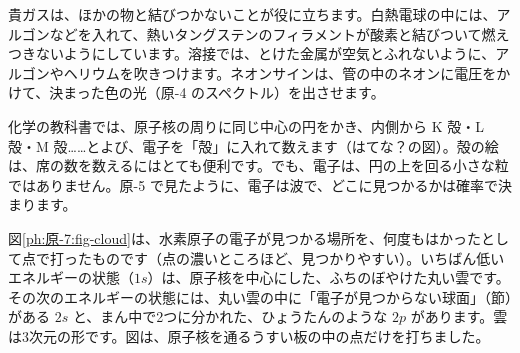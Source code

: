 \begin{phmijika}
貴ガスは、ほかの物と結びつかないことが役に立ちます。白熱電球の中には、アルゴンなどを入れて、熱いタングステンのフィラメントが酸素と結びついて燃えつきないようにしています。溶接では、とけた金属が空気とふれないように、アルゴンやヘリウムを吹きつけます。ネオンサインは、管の中のネオンに電圧をかけて、決まった色の光（原-4 のスペクトル）を出させます。
\end{phmijika}

\label{ph:原-7:sec2}
化学の教科書では、原子核の周りに同じ中心の円をかき、内側から K 殻・L 殻・M 殻……とよび、電子を「殻」に入れて数えます（はてな？の図）。殻の絵は、席の数を数えるにはとても便利です。でも、電子は、円の上を回る小さな粒ではありません。原-5 で見たように、電子は波で、どこに見つかるかは確率で決まります。

図\ref{ph:原-7:fig-cloud}は、水素原子の電子が見つかる場所を、何度もはかったとして点で打ったものです（点の濃いところほど、見つかりやすい）。いちばん低いエネルギーの状態（$1s$）は、原子核を中心にした、ふちのぼやけた丸い雲です。その次のエネルギーの状態には、丸い雲の中に「電子が見つからない球面」（節）がある $2s$ と、まん中で2つに分かれた、ひょうたんのような $2p$ があります。雲は3次元の形です。図は、原子核を通るうすい板の中の点だけを打ちました。

